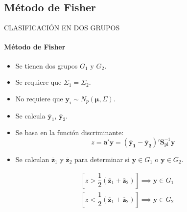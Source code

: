 \subsection{Método de Fisher}
\begin{frame}{CLASIFICACIÓN EN DOS GRUPOS}
    \framesubtitle{Método de Fisher}
    \begin{itemize}
        \item Se tienen dos grupos $G_1$ y $G_2$.
        \item Se requiere que $\Sigma_1=\Sigma_2$.
        \item No requiere que $\mathbf{y}_i\sim N_p(\pmb{\mu},\Sigma)$.
        \item Se calcula $\mathbf{\overbar{y}}_1$, $\mathbf{\overbar{y}}_2$.
        \item Se basa en la función discriminante:\begin{equation}
            z=\mathbf{a}'\mathbf{y}=\left(\mathbf{\overbar{y}_1}-\mathbf{\overbar{y}_2}\right)'\mathbf{S}_{\text{pl}}^{-1}\mathbf{y}
        \end{equation}
        \item Se calculan $\mathbf{\overbar{z}}_1$ y $\mathbf{\overbar{z}}_2$ para determinar si $\mathbf{y}\in G_1$ o $\mathbf{y}\in G_2$.
    \end{itemize}
    \begin{align*}
        \left[z>\dfrac{1}{2}\left(\mathbf{\overbar{z}}_1+\mathbf{\overbar{z}}_2\right)\right]\implies \mathbf{y}\in G_1\\
        \left[z<\dfrac{1}{2}\left(\mathbf{\overbar{z}}_1+\mathbf{\overbar{z}}_2\right)\right]\implies \mathbf{y}\in G_2
    \end{align*}
\end{frame}

